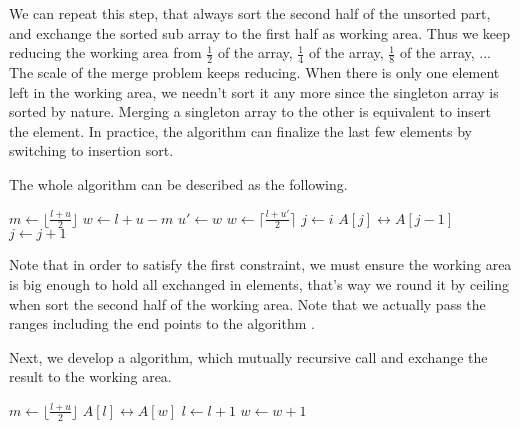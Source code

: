 \documentclass[UTF8]{article}
\begin{document}
We can repeat this step, that always sort the second half of the unsorted part, and exchange
the sorted sub array to the first half as working area. Thus we keep reducing the working area
from $\frac{1}{2}$ of the array, $\frac{1}{4}$
of the array, $\frac{1}{8}$ of the array, ... The scale of the merge problem keeps reducing.
When there is only one element left in the working area, we needn't sort it any more since
the singleton array is sorted by nature. Merging a singleton array to the other is equivalent
to insert the element. In practice, the algorithm can finalize the last few
elements by switching to insertion sort.

The whole algorithm can be described as the following.

\begin{algorithmic}[1]
    \State $m \gets \lfloor \frac{l + u}{2} \rfloor$
    \State $w \gets l + u - m$
    \State {} 
      \State $u' \gets w$
      \State $w \gets \lceil \frac{l + u'}{2} \rceil$ 
      \State {} 
      \State {}
    \EndWhile
     
      \State $j \gets i$
        \State {} $A[j] \leftrightarrow A[j-1]$
        \State $j \gets j + 1$
      \EndWhile
    \EndFor
  \EndIf
\EndProcedure
\end{algorithmic}

Note that in order to satisfy the first constraint, we must ensure the working area is big enough to hold
all exchanged in elements, that's way we round it by ceiling when sort the second half of the working area.
Note that we actually pass the ranges including the end points to the algorithm .

Next, we develop a  algorithm, which mutually recursive call  and exchange the result
to the working area.

\begin{algorithmic}[1]
    \State $m \gets \lfloor \frac{l + u}{2} \rfloor$
    \State {}
    \State {}
    \State {}
  \Else {}
      \State {} $A[l] \leftrightarrow A[w]$
      \State $l \gets l + 1$
      \State $w \gets w + 1$
    \EndWhile
  \EndIf
\EndProcedure
\end{algorithmic}
\end{document}

